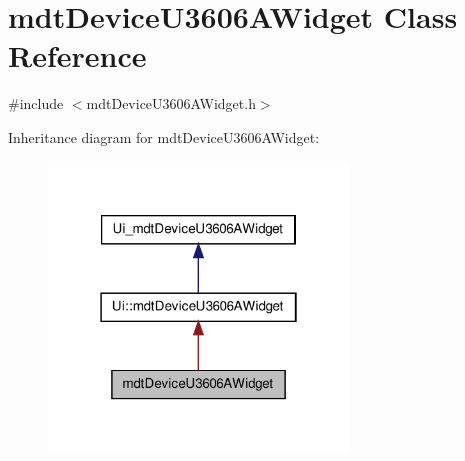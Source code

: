 \hypertarget{classmdt_device_u3606_a_widget}{
\section{mdtDeviceU3606AWidget Class Reference}
\label{classmdt_device_u3606_a_widget}
}


{\ttfamily \#include $<$mdtDeviceU3606AWidget.h$>$}



Inheritance diagram for mdtDeviceU3606AWidget:\nopagebreak
\begin{figure}[H]
\begin{center}
\leavevmode
\includegraphics[width=226pt]{classmdt_device_u3606_a_widget__inherit__graph}
\end{center}
\end{figure}


